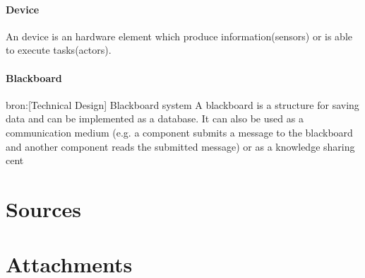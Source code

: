 \documentclass[12pt,a4paper]{report}
\begin{document}
\subsubsection{Device}
An device is an hardware element which produce information(sensors) or is able to execute tasks(actors).
\subsubsection{Blackboard}
bron:[Technical Design] Blackboard system
A blackboard is a structure for saving data and can be implemented as a database. It can also be used as a communication medium (e.g. a component submits a message to the blackboard and another component reads the submitted message) or as a knowledge sharing cent

\chapter{Sources}

\chapter{Attachments}



\end{document}
